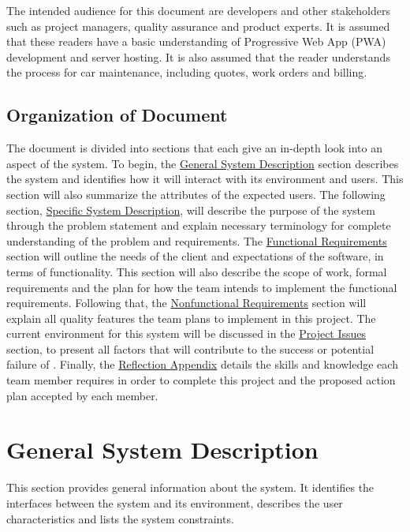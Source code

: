 \documentclass[12pt]{article}
\begin{document}
  The intended audience for this document are developers and other stakeholders such as project managers, quality assurance and product experts. It is assumed that these readers have a basic understanding of Progressive Web App (PWA) development and server hosting. It is also assumed that the reader understands the process for car maintenance, including quotes, work orders and billing.

\subsection{Organization of Document}

  The document is divided into sections that each give an in-depth look into an aspect of the system. To begin, the \hyperref[sec:GSD]{General System Description} section describes the system and identifies how it will interact with its environment and users. This section will also summarize the attributes of the expected users. The following section, \hyperref[sec:SSD]{Specific System Description}, will describe the purpose of the system through the problem statement and explain necessary terminology for complete understanding of the problem and requirements. The \hyperref[sec:FuncReq]{Functional Requirements} section will outline the needs of the client and expectations of the software, in terms of functionality. This section will also describe the scope of work, formal requirements and the plan for how the team intends to implement the functional requirements. Following that, the \hyperref[sec:NFuncReq]{Nonfunctional Requirements} section will explain all quality features the team plans to implement in this project. The current environment for this system will be discussed in the \hyperref[sec:PI]{Project Issues} section, to present all factors that will contribute to the success or potential failure of \progname{}. Finally, the \hyperref[sec:refAppendix]{Reflection Appendix} details the skills and knowledge each team member requires in order to complete this project and the proposed action plan accepted by each member. 

\section{General System Description} \label{sec:GSD}

This section provides general information about the system.  It identifies the
interfaces between the system and its environment, describes the user
characteristics and lists the system constraints.
\end{document}
